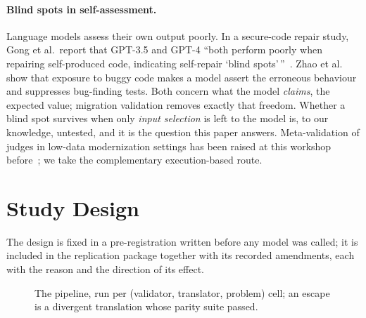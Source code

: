 \documentclass[sigconf]{acmart}
\begin{document}
\paragraph{Blind spots in self-assessment.}
Language models assess their own output poorly. In a secure-code repair study, Gong et
al.\ report that GPT-3.5 and GPT-4 ``both perform poorly when repairing self-produced code,
indicating self-repair `blind spots'\,''~\cite{gong2024secure}. Zhao et
al.~\cite{zhao2026misguidance} show that exposure to
buggy code makes a model assert the erroneous behaviour and suppresses bug-finding tests. Both
concern what the model \emph{claims}, the expected value; migration validation removes exactly
that freedom. Whether a blind spot
survives when only \emph{input selection} is left to the model is, to our knowledge,
untested, and it is the
question this paper answers. Meta-validation of judges in low-data modernization
settings has been raised at this workshop before~\cite{fandina2025vintage}; we take the
complementary execution-based route.

\section{Study Design}

The design is fixed in a pre-registration written before any model was called; it is included in
the replication package together with its \NAmendments{} recorded amendments, each with the reason
and the direction of its effect.

\begin{figure}[t]
\centering
{}
\caption{The pipeline, run per (validator, translator, problem) cell; an escape is a
divergent translation whose parity suite passed.}
\label{fig:pipeline}
\end{figure}
\end{document}
